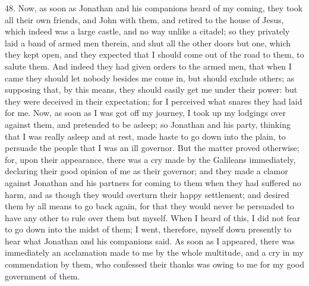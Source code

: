 48. Now, as soon as Jonathan and his companions heard of my coming, they
took all their own friends, and John with them, and retired to the house
of Jesus, which indeed was a large castle, and no way unlike a citadel; so
they privately laid a band of armed men therein, and shut all the other
doors but one, which they kept open, and they expected that I should come
out of the road to them, to salute them. And indeed they had given orders
to the armed men, that when I came they should let nobody besides me come
in, but should exclude others; as supposing that, by this means, they
should easily get me under their power: but they were deceived in their
expectation; for I perceived what snares they had laid for me. Now, as
soon as I was got off my journey, I took up my lodgings over against them,
and pretended to be asleep; so Jonathan and his party, thinking that I was
really asleep and at rest, made haste to go down into the plain, to
persuade the people that I was an ill governor. But the matter proved
otherwise; for, upon their appearance, there was a cry made by the
Galileans immediately, declaring their good opinion of me as their
governor; and they made a clamor against Jonathan and his partners for
coming to them when they had suffered no harm, and as though they would
overturn their happy settlement; and desired them by all means to go back
again, for that they would never be persuaded to have any other to rule
over them but myself. When I heard of this, I did not fear to go down into
the midst of them; I went, therefore, myself down presently to hear what
Jonathan and his companions said. As soon as I appeared, there was
immediately an acclamation made to me by the whole multitude, and a cry in
my commendation by them, who confessed their thanks was owing to me for my
good government of them.


